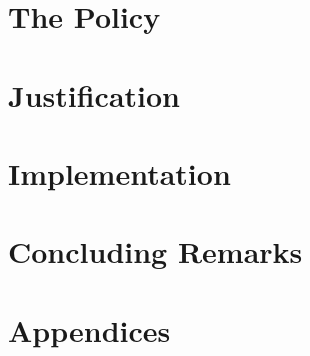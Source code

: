 \documentclass[10pt]{book} %
\begin{document}
\chapter{The Policy}

\chapter{Justification}





\chapter{Implementation}








\chapter{Concluding Remarks}

\chapter*{Appendices}


\clearpage



\end{document}
